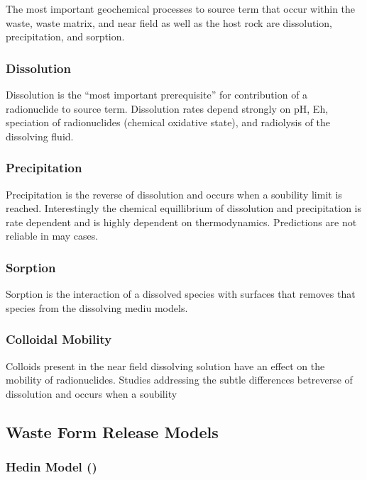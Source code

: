 The most important geochemical processes to source term that occur within the
waste, waste matrix, and near field as well as the host rock are dissolution,
precipitation, and sorption.  \cite{bracke_safety_2008}

\subsubsection{Dissolution}

Dissolution is the ``most important prerequisite'' for contribution of a
radionuclide to source term. Dissolution rates depend strongly on pH, Eh,
speciation of radionuclides (chemical oxidative state), and radiolysis of the
dissolving fluid.

\subsubsection{Precipitation}

Precipitation is the reverse of dissolution and occurs when a soubility limit
is reached. Interestingly the chemical equillibrium of dissolution and
precipitation is rate dependent and is highly dependent on thermodynamics.
Predictions are not reliable in may cases.

\subsubsection{Sorption}

Sorption is the interaction of a dissolved species with surfaces that removes
that species from the dissolving mediu models.


\subsubsection{Colloidal Mobility}

Colloids present in the near field dissolving solution have an effect on the
mobility of radionuclides. Studies addressing the subtle differences betreverse
of dissolution and occurs when a soubility

\subsection{Waste Form Release Models}

\subsubsection{Hedin Model (\cite{hedin_integrated_2002})}

